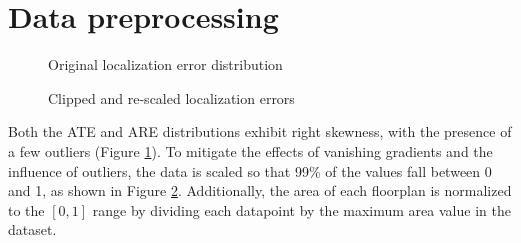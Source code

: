 \section{Data preprocessing} %

\begin{figure}[ht!]
    \centering
    \caption{Original localization error distribution}\label{fig:dataDistribution}
\end{figure}

\begin{figure}[ht!]
    \centering
    \caption{Clipped and re-scaled localization errors}\label{fig:dataDistribution_scaled}
\end{figure}

\noindent
Both the ATE and ARE distributions exhibit right skewness, with the presence of a few outliers (Figure \ref{fig:dataDistribution}). To mitigate the effects of vanishing gradients and the influence of outliers, the data is scaled so that 99\% of the values fall between 0 and 1, as shown in Figure \ref{fig:dataDistribution_scaled}. Additionally, the area of each floorplan is normalized to the $[0, 1]$ range by dividing each datapoint by the maximum area value in the dataset.


